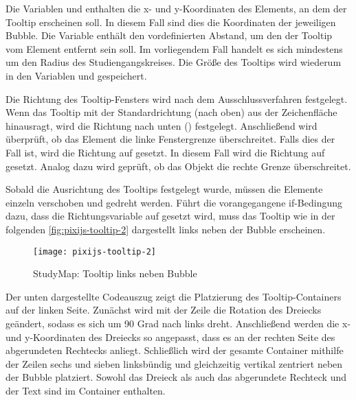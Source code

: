 Die Variablen  und  enthalten die x- und y-Koordinaten des Elements, an dem der Tooltip erscheinen soll. In diesem Fall sind dies die Koordinaten der jeweiligen Bubble. Die Variable  enthält den vordefinierten Abstand, um den der Tooltip vom Element entfernt sein soll. Im vorliegendem Fall handelt es sich mindestens um den Radius des Studiengangskreises. Die Größe des Tooltips wird wiederum in den Variablen  und  gespeichert.

Die Richtung des Tooltip-Fensters wird nach dem Ausschlussverfahren festgelegt. Wenn das Tooltip mit der Standardrichtung  (nach oben) aus der Zeichenfläche hinausragt, wird die Richtung nach unten () festgelegt. Anschließend wird überprüft, ob das Element die linke Fenstergrenze überschreitet. Falls dies der Fall ist, wird die Richtung auf  gesetzt. In diesem Fall wird die Richtung auf  gesetzt. Analog dazu wird geprüft, ob das Objekt die rechte Grenze überschreitet.

Sobald die Ausrichtung des Tooltips festgelegt wurde, müssen die Elemente einzeln verschoben und gedreht werden. Führt die vorangegangene if-Bedingung dazu, dass die Richtungsvariable  auf  gesetzt wird, muss das Tooltip wie in der folgenden \autoref{fig:pixijs-tooltip-2} dargestellt links neben der Bubble erscheinen.

\begin{figure}[H]
    \centering
    \texttt{[image: pixijs-tooltip-2]}
    \caption{StudyMap: Tooltip links neben Bubble}
    \label{fig:pixijs-tooltip-2}
\end{figure}

Der unten dargestellte Codeauszug zeigt die Platzierung des Tooltip-Containers auf der linken Seite. Zunächst wird mit der Zeile  die Rotation des Dreiecks geändert, sodass es sich um 90 Grad nach links dreht. Anschließend werden die x- und y-Koordinaten des Dreiecks so angepasst, dass es an der rechten Seite des abgerundeten Rechtecks anliegt. Schließlich wird der gesamte Container mithilfe der Zeilen sechs und sieben linksbündig und gleichzeitig vertikal zentriert neben der Bubble platziert. Sowohl das Dreieck als auch das abgerundete Rechteck und der Text sind im Container enthalten. %

